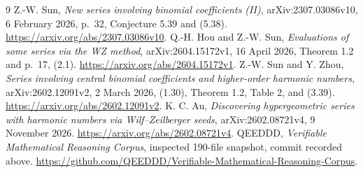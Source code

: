 \documentclass[11pt,a4paper]{article}
\begin{document}
\begin{thebibliography}{9}
 Z.-W. Sun, \emph{New series involving binomial coefficients (II)},
arXiv:2307.03086v10, 6 February 2026, p.~32, Conjecture 5.39 and (5.38).
\url{https://arxiv.org/abs/2307.03086v10}.
 Q.-H. Hou and Z.-W. Sun, \emph{Evaluations of some series via the
WZ method}, arXiv:2604.15172v1, 16 April 2026, Theorem 1.2 and p.~17, (2.1).
\url{https://arxiv.org/abs/2604.15172v1}.
 Z.-W. Sun and Y. Zhou, \emph{Series involving central binomial
coefficients and higher-order harmonic numbers}, arXiv:2602.12091v2,
2 March 2026, (1.30), Theorem 1.2, Table 2, and (3.39).
\url{https://arxiv.org/abs/2602.12091v2}.
 K. C. Au, \emph{Discovering hypergeometric series with harmonic
numbers via Wilf--Zeilberger seeds}, arXiv:2602.08721v4, 9 November 2026.
\url{https://arxiv.org/abs/2602.08721v4}.
 QEEDDD, \emph{Verifiable Mathematical Reasoning Corpus},
inspected 190-file snapshot, commit recorded above.
\url{https://github.com/QEEDDD/Verifiable-Mathematical-Reasoning-Corpus}.
\end{thebibliography}
\end{document}
